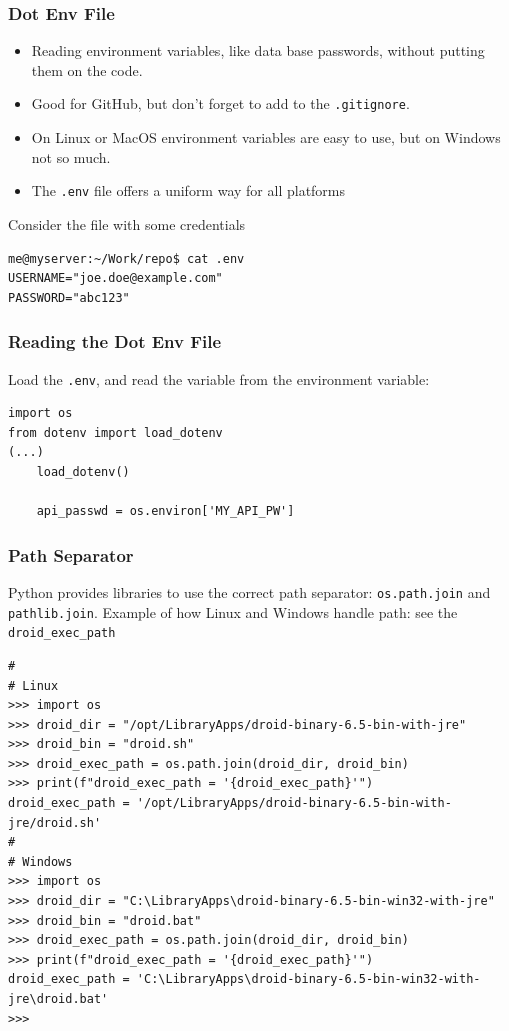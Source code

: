 \documentclass[aspectratio=169]{beamer}
\begin{document}
\begin{frame}[fragile]
\frametitle{Dot Env File}
\begin{itemize}
    \item Reading environment variables, like data base passwords, without putting them on the code. 
    \item Good for GitHub, but don't forget to add to the \texttt{.gitignore}.
    \item On Linux or MacOS environment variables are easy to use, but on Windows not so much.
    \item The \texttt{.env} file offers a uniform way for all platforms
\end{itemize}

Consider the file with some credentials
\small
\begin{verbatim}
me@myserver:~/Work/repo$ cat .env
USERNAME="joe.doe@example.com"
PASSWORD="abc123"
\end{verbatim}
\normalsize
\end{frame}


\begin{frame}[fragile]
\frametitle{Reading the Dot Env File}

Load the \texttt{.env}, and read the variable from the environment variable:

\small
\begin{verbatim}
import os
from dotenv import load_dotenv
(...)
    load_dotenv()

    api_passwd = os.environ['MY_API_PW']
\end{verbatim}
\normalsize
\end{frame}

\begin{frame}[fragile]
\frametitle{Path Separator}

Python provides libraries to use the correct path separator: \texttt{os.path.join} and \texttt{pathlib.join}. Example of how Linux and Windows handle path: see the \verb|droid_exec_path|

\scriptsize
\begin{verbatim}
#
# Linux
>>> import os
>>> droid_dir = "/opt/LibraryApps/droid-binary-6.5-bin-with-jre"
>>> droid_bin = "droid.sh"
>>> droid_exec_path = os.path.join(droid_dir, droid_bin)
>>> print(f"droid_exec_path = '{droid_exec_path}'")
droid_exec_path = '/opt/LibraryApps/droid-binary-6.5-bin-with-jre/droid.sh'
#
# Windows
>>> import os
>>> droid_dir = "C:\LibraryApps\droid-binary-6.5-bin-win32-with-jre"
>>> droid_bin = "droid.bat"
>>> droid_exec_path = os.path.join(droid_dir, droid_bin)
>>> print(f"droid_exec_path = '{droid_exec_path}'")
droid_exec_path = 'C:\LibraryApps\droid-binary-6.5-bin-win32-with-jre\droid.bat'
>>>
\end{verbatim}
\normalsize
\end{frame}
\end{document}
